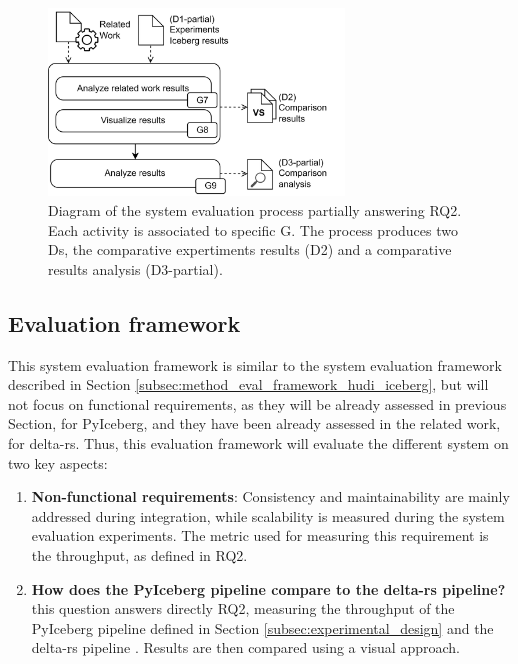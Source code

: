 \begin{figure}[!ht]
    \begin{center}
    \includegraphics[width=0.7\textwidth]{figures/3-method/method_comp.png}
    \caption[System evaluation process - PyIceberg vs. delta-rs]{Diagram of the system evaluation process partially answering \gls{RQ}2. Each activity is associated to specific \gls{G}. The process produces two \glspl{D}, the comparative expertiments results (\gls{D}2) and a comparative results analysis (\gls{D}3-partial).}
    \label{fig:method_comparison}
    \end{center}
\end{figure}



\subsection{Evaluation framework}
\label{subsec:method_eval_framework_iceberg_delta}

This system evaluation framework is similar to the system evaluation framework described in Section \ref{subsec:method_eval_framework_hudi_iceberg}, but will not focus on functional requirements, as they will be already assessed in previous Section, for PyIceberg, and they have been already assessed in the related work, for delta-rs. Thus, this evaluation framework will evaluate the different system on two key aspects:
\begin{enumerate}
    \item \textbf{Non-functional requirements}: Consistency and maintainability are mainly addressed during integration, while scalability is measured during the system evaluation experiments. The metric used for measuring this requirement is the throughput, as defined in \gls{RQ}2.
    \item \textbf{How does the PyIceberg pipeline compare to the delta-rs pipeline?} this question answers directly \gls{RQ}2, measuring the throughput of the PyIceberg pipeline defined in Section \ref{subsec:experimental_design} and the delta-rs pipeline \cite{manfrediReducingReadWrite2024}. Results are then compared using a visual approach.
\end{enumerate}


